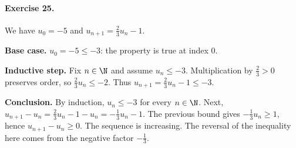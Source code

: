 \paragraph{Exercise 25.} We have $u_0=-5$ and $u_{n+1}=\frac23u_n-1$.
\par\smallskip\textbf{Base case.} $u_0=-5\le-3$: the property is true at index $0$.
\par\smallskip\textbf{Inductive step.} Fix $n\in\N$ and assume $u_n\le-3$. Multiplication by $\frac23>0$ preserves order, so $\frac23u_n\le-2$. Thus $u_{n+1}=\frac23u_n-1\le-3$.
\par\smallskip\textbf{Conclusion.} By induction, $u_n\le-3$ for every $n\in\N$.
Next, $u_{n+1}-u_n=\frac23u_n-1-u_n=-\frac13u_n-1$. The previous bound gives $-\frac13u_n\ge1$, hence $u_{n+1}-u_n\ge0$. The sequence is increasing. The reversal of the inequality here comes from the negative factor $-\frac13$.

\fi

